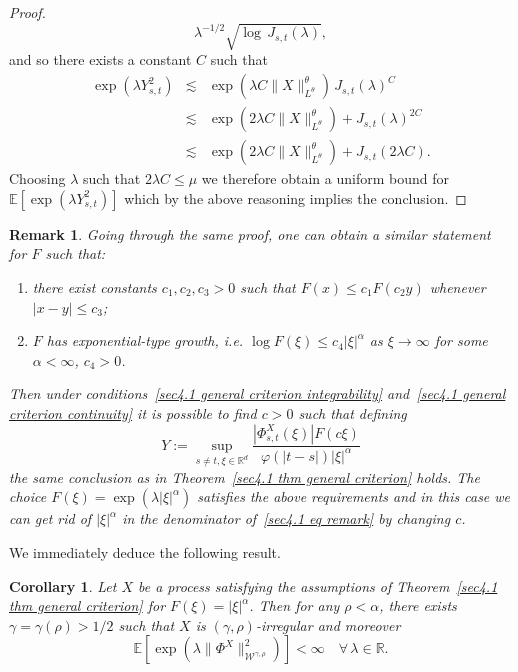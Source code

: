 \documentclass[10pt]{article}
\newcommand{\assign}{:=}
\newtheorem{corollary}[theorem]{Corollary}
\newtheorem{remark}[theorem]{Remark}
\begin{document}
\begin{proof}
\[     \lambda^{- 1 / 2} \sqrt{\log \, J_{s, t} (\lambda)}, \]
  and so there exists a constant $C$ such that
  \begin{eqnarray*}
    \exp (\lambda Y_{s, t}^2) & \lesssim & \exp (\lambda C \| X
    \|_{L^{\theta}}^{\theta})   \, J_{s, t} (\lambda)^C\\
    & \lesssim & \exp (2 \lambda C \| X \|_{L^{\theta}}^{\theta}) + J_{s, t}
    (\lambda)^{2 C}\\
    & \lesssim & \exp (2 \lambda C \| X \|_{L^{\theta}}^{\theta}) + J_{s, t}
    (2 \lambda C) .
  \end{eqnarray*}
  Choosing $\lambda$ such that $2 \lambda C \leqslant \mu$ we therefore obtain
  a uniform bound for $\mathbb{E} [\exp (\lambda Y_{s, t}^2)]$ which by the
  above reasoning implies the conclusion.
\end{proof}

\begin{remark}
  \label{sec4.1 remark general criterion}Going through the same proof, one can
  obtain a similar statement for $F$ such that:
  \begin{enumerate}[label=\roman*.]
    \item there exist constants $c_1, c_2, c_3 > 0$ such that $F (x) \leqslant
    c_1 F (c_2 y)$ whenever $| x - y | \leqslant c_3$;
    
    \item $F$ has exponential\mbox{-}type growth, i.e. $\log F (\xi) \leqslant
    c_4 | \xi |^{\alpha}$ as $\xi \rightarrow \infty$ for some $\alpha <
    \infty$, $c_4 > 0$.
  \end{enumerate}
  Then under conditions~\eqref{sec4.1 general criterion integrability}
  and~\eqref{sec4.1 general criterion continuity} it is possible to find $c >
  0$ such that defining
  \begin{equation}
    Y \assign \sup_{s \neq t, \xi \in \mathbb{R}^d} \frac{| \Phi^X_{s, t}
    (\xi) | F (c \xi)}{\varphi (| t - s |)  | \xi |^{\alpha}} \label{sec4.1 eq
    remark}
  \end{equation}
  the same conclusion as in Theorem~\ref{sec4.1 thm general criterion} holds.
  The choice $F (\xi) = \exp (\lambda | \xi |^{\alpha})$ satisfies the above
  requirements and in this case we can get rid of $| \xi |^{\alpha}$ in the
  denominator of~\eqref{sec4.1 eq remark} by changing $c$.
\end{remark}

We immediately deduce the following result.

\begin{corollary}
  \label{sec4.1 corollary exp integr rho}Let $X$ be a process satisfying the
  assumptions of Theorem~\ref{sec4.1 thm general criterion} for $F (\xi) = |
  \xi |^{\alpha}$. Then for any $\rho < \alpha$, there exists $\gamma = \gamma
  (\rho) > 1 / 2$ such that $X$ is $(\gamma, \rho)$-irregular and moreover
  \begin{equation}
    \mathbb{E} [\exp (\lambda \| \Phi^X \|_{\mathcal{W}^{\gamma, \rho}}^2) ] <
    \infty \quad \forall \, \lambda \in \mathbb{R}. \label{sec4.1 exp integr
    rho irr}
  \end{equation}
\end{corollary}
\end{document}
